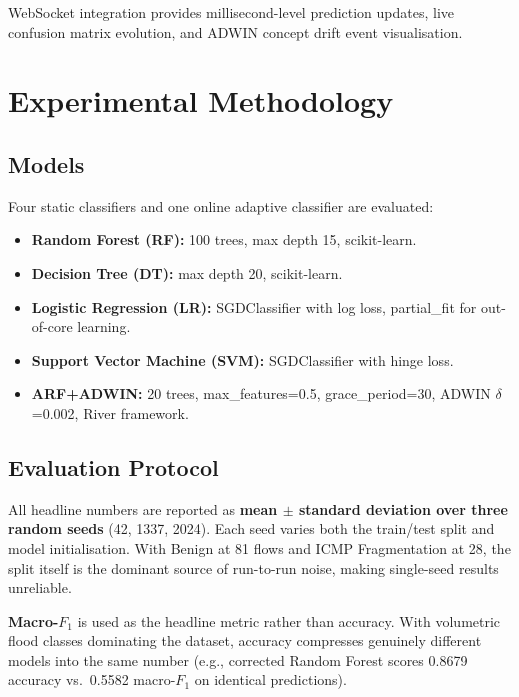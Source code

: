 \documentclass[conference]{IEEEtran}
\begin{document}
WebSocket integration provides millisecond-level prediction updates, live confusion matrix evolution, and ADWIN concept drift event visualisation.

\section{Experimental Methodology}

\subsection{Models}

Four static classifiers and one online adaptive classifier are evaluated:

\begin{itemize}
    \item \textbf{Random Forest (RF):} 100 trees, max depth 15, scikit-learn.
    \item \textbf{Decision Tree (DT):} max depth 20, scikit-learn.
    \item \textbf{Logistic Regression (LR):} SGDClassifier with log loss, partial\_fit for out-of-core learning.
    \item \textbf{Support Vector Machine (SVM):} SGDClassifier with hinge loss.
    \item \textbf{ARF+ADWIN:} 20 trees, max\_features=0.5, grace\_period=30, ADWIN $\delta$=0.002, River framework.
\end{itemize}

\subsection{Evaluation Protocol}

All headline numbers are reported as \textbf{mean $\pm$ standard deviation over three random seeds} (42, 1337, 2024). Each seed varies both the train/test split and model initialisation. With Benign at 81 flows and ICMP Fragmentation at 28, the split itself is the dominant source of run-to-run noise, making single-seed results unreliable.

\textbf{Macro-$F_1$} is used as the headline metric rather than accuracy. With volumetric flood classes dominating the dataset, accuracy compresses genuinely different models into the same number (e.g., corrected Random Forest scores 0.8679 accuracy vs.\ 0.5582 macro-$F_1$ on identical predictions).
\end{document}
